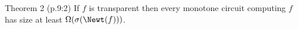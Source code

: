 \begin{sourceresult}{Theorem 2 (p.9:2)}
If $f$ is transparent then every monotone circuit computing $f$ has size at least $\Omega(\sigma(\Newt(f)))$.
\end{sourceresult}
